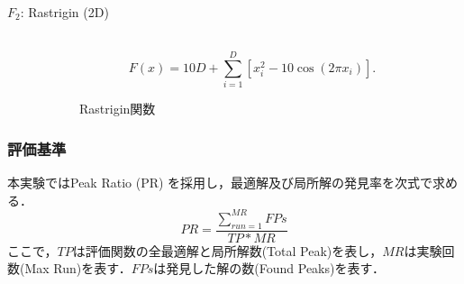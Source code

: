 \documentclass[a4j,11pt]{jarticle}
\begin{document}
\begin{description}
\item[$F_2$: Rastrigin (2D)]\mbox{}\\
\begin{equation}
\label{eq:nsba-F2}
F(x)=10D+\sum_{i=1}^D[x_i^2-10\cos(2\pi x_i)].
\end{equation}

\begin{figure}[t]
\centering
{}
\caption{Rastrigin関数}
\label{fig:nsba-f2}
\end{figure}

\end{description}
\FloatBarrier

\subsubsection{評価基準}
\label{sss:NSBA-eval}
本実験ではPeak Ratio (PR) \cite{CDE} を採用し，最適解及び局所解の発見率を次式で求める．
\begin{equation}
\label{eq:PR}
PR=\frac{\sum_{run=1}^{MR}FPs}{TP*MR}
\end{equation}
ここで，$TP$は評価関数の全最適解と局所解数(Total Peak)を表し，$MR$は実験回数(Max Run)を表す．$FPs$は発見した解の数(Found Peaks)を表す．
\end{document}
